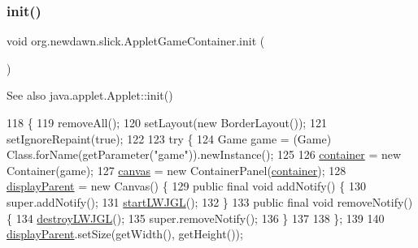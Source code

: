 \subsubsection{\texorpdfstring{init()}{init()}}
{\footnotesize\ttfamily void org.\+newdawn.\+slick.\+Applet\+Game\+Container.\+init (\begin{DoxyParamCaption}{ }\end{DoxyParamCaption})\hspace{0.3cm}{\ttfamily [inline]}}

\begin{DoxySeeAlso}{See also}
java.\+applet.\+Applet\+::init() 
\end{DoxySeeAlso}

\begin{DoxyCode}
118                       \{
119       removeAll();
120       setLayout(\textcolor{keyword}{new} BorderLayout());
121       setIgnoreRepaint(\textcolor{keyword}{true});
122 
123       \textcolor{keywordflow}{try} \{
124          Game game = (Game) Class.forName(getParameter(\textcolor{stringliteral}{"game"})).newInstance();
125          
126          \mbox{\hyperlink{classorg_1_1newdawn_1_1slick_1_1_applet_game_container_ad11e66254b14c604db1a66c3d4efc818}{container}} = \textcolor{keyword}{new} Container(game);
127          \mbox{\hyperlink{classorg_1_1newdawn_1_1slick_1_1_applet_game_container_acf26307e20e497f0fbdabbb5110ab852}{canvas}} = \textcolor{keyword}{new} ContainerPanel(\mbox{\hyperlink{classorg_1_1newdawn_1_1slick_1_1_applet_game_container_ad11e66254b14c604db1a66c3d4efc818}{container}});
128          \mbox{\hyperlink{classorg_1_1newdawn_1_1slick_1_1_applet_game_container_a62b5a90dcfc53b23717ea63133f86332}{displayParent}} = \textcolor{keyword}{new} Canvas() \{
129             \textcolor{keyword}{public} \textcolor{keyword}{final} \textcolor{keywordtype}{void} addNotify() \{
130                super.addNotify();
131                \mbox{\hyperlink{classorg_1_1newdawn_1_1slick_1_1_applet_game_container_af95e36a2d15fa8475f93483776eb2fe3}{startLWJGL}}();
132             \}
133             \textcolor{keyword}{public} \textcolor{keyword}{final} \textcolor{keywordtype}{void} removeNotify() \{
134                \mbox{\hyperlink{classorg_1_1newdawn_1_1slick_1_1_applet_game_container_af77f7ab58fe34f57e2e81343edde8c18}{destroyLWJGL}}();
135                super.removeNotify();
136             \}
137 
138          \};
139 
140          \mbox{\hyperlink{classorg_1_1newdawn_1_1slick_1_1_applet_game_container_a62b5a90dcfc53b23717ea63133f86332}{displayParent}}.setSize(getWidth(), getHeight());

\end{DoxyCode}
